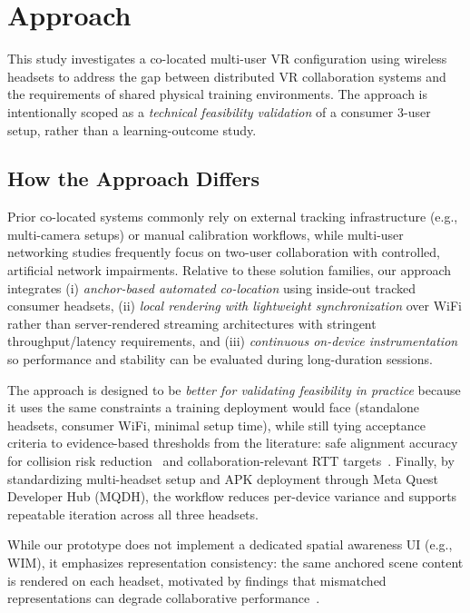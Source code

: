 \section{Approach}

This study investigates a co-located multi-user VR configuration using wireless headsets to address the gap between distributed VR collaboration systems and the requirements of shared physical training environments. The approach is intentionally scoped as a \emph{technical feasibility validation} of a consumer 3-user setup, rather than a learning-outcome study.

\subsection{How the Approach Differs}
Prior co-located systems commonly rely on external tracking infrastructure (e.g., multi-camera setups) or manual calibration workflows, while multi-user networking studies frequently focus on two-user collaboration with controlled, artificial network impairments. Relative to these solution families, our approach integrates (i) \emph{anchor-based automated co-location} using inside-out tracked consumer headsets, (ii) \emph{local rendering with lightweight synchronization} over WiFi rather than server-rendered streaming architectures with stringent throughput/latency requirements, and (iii) \emph{continuous on-device instrumentation} so performance and stability can be evaluated during long-duration sessions.

The approach is designed to be \emph{better for validating feasibility in practice} because it uses the same constraints a training deployment would face (standalone headsets, consumer WiFi, minimal setup time), while still tying acceptance criteria to evidence-based thresholds from the literature: safe alignment accuracy for collision risk reduction~\cite{ReimerDennis2021CfSV} and collaboration-relevant RTT targets~\cite{VanDammeSam2024Iolo}. Finally, by standardizing multi-headset setup and APK deployment through Meta Quest Developer Hub (MQDH), the workflow reduces per-device variance and supports repeatable iteration across all three headsets.

While our prototype does not implement a dedicated spatial awareness UI (e.g., WIM), it emphasizes representation consistency: the same anchored scene content is rendered on each headset, motivated by findings that mismatched representations can degrade collaborative performance~\cite{WeissYannick2025ItEo}.

